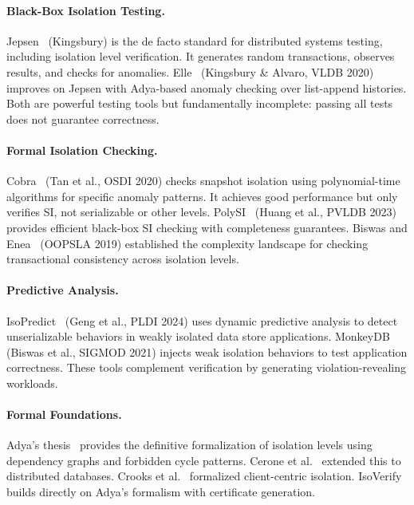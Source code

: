 \documentclass[11pt]{article}
\begin{document}
\paragraph{Black-Box Isolation Testing.}
Jepsen~\cite{jepsen} (Kingsbury) is the de facto standard for distributed
systems testing, including isolation level verification. It generates random
transactions, observes results, and checks for anomalies.
Elle~\cite{elle} (Kingsbury \& Alvaro, VLDB 2020) improves on Jepsen with
Adya-based anomaly checking over list-append histories. Both are powerful
testing tools but fundamentally incomplete: passing all tests does not
guarantee correctness.

\paragraph{Formal Isolation Checking.}
Cobra~\cite{cobra} (Tan et al., OSDI 2020) checks snapshot isolation using
polynomial-time algorithms for specific anomaly patterns.  It achieves good
performance but only verifies SI, not serializable or other levels.
PolySI~\cite{polysi} (Huang et al., PVLDB 2023) provides efficient
black-box SI checking with completeness guarantees.  Biswas and
Enea~\cite{biswas2019} (OOPSLA 2019) established the complexity landscape
for checking transactional consistency across isolation levels.

\paragraph{Predictive Analysis.}
IsoPredict~\cite{isopredict} (Geng et al., PLDI 2024) uses dynamic
predictive analysis to detect unserializable behaviors in weakly isolated
data store applications.  MonkeyDB~\cite{monkeydb} (Biswas et al., SIGMOD
2021) injects weak isolation behaviors to test application correctness.
These tools complement verification by generating violation-revealing
workloads.

\paragraph{Formal Foundations.}
Adya's thesis~\cite{adya1999} provides the definitive formalization of
isolation levels using dependency graphs and forbidden cycle patterns.
Cerone et al.~\cite{cerone2015} extended this to distributed databases.
Crooks et al.~\cite{crooks2017} formalized client-centric isolation.
IsoVerify builds directly on Adya's formalism with certificate generation.
\end{document}
